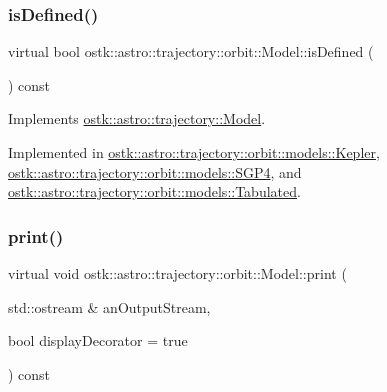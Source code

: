 \subsubsection{\texorpdfstring{is\+Defined()}{isDefined()}}
{\footnotesize\ttfamily virtual bool ostk\+::astro\+::trajectory\+::orbit\+::\+Model\+::is\+Defined (\begin{DoxyParamCaption}{ }\end{DoxyParamCaption}) const\hspace{0.3cm}{\ttfamily [pure virtual]}}



Implements \hyperlink{classostk_1_1astro_1_1trajectory_1_1_model_a0d5cf6f754905f06c0ec1e39618c20a1}{ostk\+::astro\+::trajectory\+::\+Model}.



Implemented in \hyperlink{classostk_1_1astro_1_1trajectory_1_1orbit_1_1models_1_1_kepler_a4c74402d5483a51e5e0fe1920cd52ec4}{ostk\+::astro\+::trajectory\+::orbit\+::models\+::\+Kepler}, \hyperlink{classostk_1_1astro_1_1trajectory_1_1orbit_1_1models_1_1_s_g_p4_ab18e0666588bd517c190942b1a54ed18}{ostk\+::astro\+::trajectory\+::orbit\+::models\+::\+S\+G\+P4}, and \hyperlink{classostk_1_1astro_1_1trajectory_1_1orbit_1_1models_1_1_tabulated_ad114ba4762b54211f74f0aa3ac5eedae}{ostk\+::astro\+::trajectory\+::orbit\+::models\+::\+Tabulated}.

\mbox{\label{classostk_1_1astro_1_1trajectory_1_1orbit_1_1_model_a8ea45c1a6e51a6153ce3f72f5294f0c6}} 
\subsubsection{\texorpdfstring{print()}{print()}}
{\footnotesize\ttfamily virtual void ostk\+::astro\+::trajectory\+::orbit\+::\+Model\+::print (\begin{DoxyParamCaption}\item[{std\+::ostream \&}]{an\+Output\+Stream,  }\item[{bool}]{display\+Decorator = {\ttfamily true} }\end{DoxyParamCaption}) const\hspace{0.3cm}{\ttfamily [pure virtual]}}



